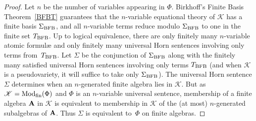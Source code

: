 \documentclass[10pt,a4paper]{amsart}
\theoremstyle{plain}
\theoremstyle{definition}
\newcommand{\Mod}{\operatorname{Mod}}
\begin{document}
\begin{proof}
Let $n$ be the number of variables appearing in $\Phi$.
Birkhoff's Finite Basis Theorem~\ref{BFBT} guarantees that the $n$-variable equational theory of $\mathscr{K}$ has a finite basis $\Sigma_{\rm BFB}$, and all $n$-variable terms reduce modulo $\Sigma_{\rm BFB}$ to one in the finite set $T_{\rm BFB}$.
Up to logical equivalence, there are only finitely many $n$-variable atomic formul{\ae} and only finitely many universal Horn sentences involving only terms from~$T_{\rm BFB}$.
Let $\Sigma$ be the conjunction of $\Sigma_{\rm BFB}$ along with the finitely many satisfied universal Horn sentences involving only terms $T_{\rm BFB}$ (and when $\mathscr{K}$ is a pseudovariety, it will suffice to take only $\Sigma_{\rm BFB}$).
The universal Horn sentence $\Sigma$ determines when an $n$-generated finite algebra lies in $\mathscr{K}$.
But as $\mathscr{K}=\Mod_{\rm fin}(\Phi)$ and $\Phi$ is an $n$-variable universal sentence, membership of a finite algebra ${\bf A}$ in $\mathscr{K}$ is equivalent to membership in $\mathscr{K}$ of the (at most) $n$-generated subalgebras of ${\bf A}$.
Thus $\Sigma$ is equivalent to~$\Phi$ on finite algebras.
\end{proof}
\end{document}
